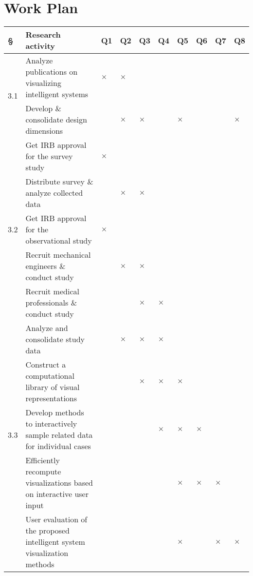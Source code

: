 \section{Work Plan}
\begin{table}[H]
\centering
{\footnotesize
\begin{tabular}{p{0.3cm}|p{10cm}|p{0.2cm}|p{0.25cm}|p{0.25cm}|p{0.25cm}|p{0.25cm}|p{0.25cm}|p{0.25cm}|p{0.25cm}} 
\hline
 {\S} & \textbf{Research activity }                                            & \textbf{Q1} & \textbf{Q2} & \textbf{Q3} & \textbf{Q4} & \textbf{Q5} & \textbf{Q6} & \textbf{Q7} & \textbf{Q8} \\ 
\hline
\multirow{2}{0.01\textwidth}{3.1} & Analyze publications on visualizing intelligent systems                  &$\times$&$\times$  &  &  &  &  &  &  \\ 
\cline{2-10}
         & Develop \& consolidate design dimensions                                               &  &$\times$  &$\times$  &  &$\times$  &  &  &$\times$  \\ 
\hline
\multirow{5}{0.01\textwidth}{3.2} & Get IRB approval for the survey study      &$\times$  &  &  &  &  &  &  &  \\ 
\cline{2-10}
         & Distribute survey \& analyze collected data                                              &  &$\times$  &$\times$  &  &  &  &  &  \\ 
\cline{2-10}
         & Get IRB approval for the observational study     &$\times$  &  &  &  &  &  &  &  \\ 
\cline{2-10}
         & Recruit mechanical engineers \& conduct study    &  &$\times$  &$\times$  &  &  &  &  &  \\ 
\cline{2-10}
         & Recruit medical professionals \& conduct study    &  & &$\times$  &$\times$   &  &  &  &  \\ 
\cline{2-10} & Analyze and consolidate study data  &  & $\times$ &$\times$ &$\times$  & & &  &  \\ 

\hline
\multirow{3}{0.01\textwidth}{3.3} & Construct a computational library of visual representations            &  &  &$\times$   &$\times$  &$\times$  & &  &  \\ 
\cline{2-10}
         & Develop methods to interactively sample related data for individual cases &  &  &  &$\times$  &$\times$  &$\times$  &  &  \\ 
\cline{2-10}
         & Efficiently recompute visualizations based on interactive user input      &  &  &  &  &$\times$  &$\times$  &$\times$  &   \\
\cline{2-10}
         & User evaluation of the proposed intelligent system visualization methods      &  &  &  &  &$\times$  &  &$\times$  &$\times$   \\
\hline
\end{tabular}
}
\end{table}